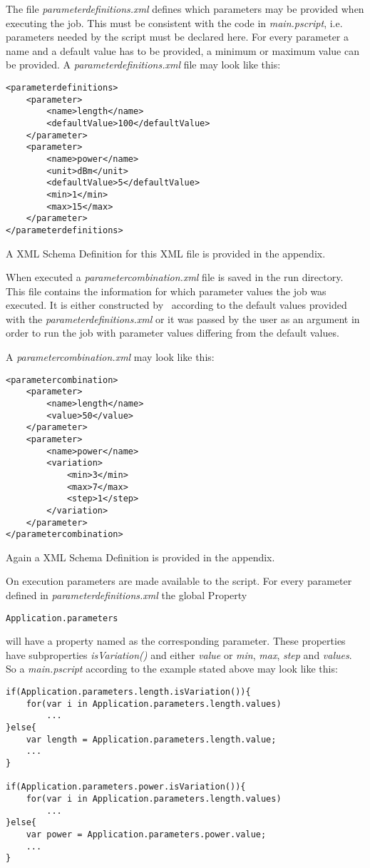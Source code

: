 The file \textit{parameterdefinitions.xml} defines which parameters may be provided when executing the job.
This must be consistent with the code in \textit{main.pscript},
i.e. parameters needed by the script must be declared here.
For every parameter a name and a default value has to be provided,
a minimum or maximum value can be provided.
A \textit{parameterdefinitions.xml} file may look like this:
\lstset{language=XML}
\begin{lstlisting}
<parameterdefinitions>
	<parameter>
		<name>length</name>
		<defaultValue>100</defaultValue>
	</parameter>
	<parameter>
		<name>power</name>
		<unit>dBm</unit>
		<defaultValue>5</defaultValue>
		<min>1</min>
		<max>15</max>
	</parameter>
</parameterdefinitions>
\end{lstlisting}
A XML Schema Definition for this XML file is provided in the appendix.\bb

When executed a \textit{parametercombination.xml} file is saved in the run directory.
This file contains the information for which parameter values the job was executed.
It is either constructed by \photoss\ according to the default values
provided with the \textit{parameterdefinitions.xml}
or it was passed by the user as an argument in order to run the job with parameter values
differing from the default values.

A \textit{parametercombination.xml} may look like this:
\begin{lstlisting}
<parametercombination>
	<parameter>
		<name>length</name>
		<value>50</value>
	</parameter>
	<parameter>
		<name>power</name>
		<variation>
			<min>3</min>
			<max>7</max>
			<step>1</step>
		</variation>
	</parameter>
</parametercombination>
\end{lstlisting}
Again a XML Schema Definition is provided in the appendix.\bb

On execution parameters are made available to the script.
For every parameter defined in \textit{parameterdefinitions.xml}
the global Property
\lstset{language=JavaScript}
\begin{lstlisting}
Application.parameters
\end{lstlisting}
will have a property named as the corresponding parameter.
These properties have subproperties \textit{isVariation()}
and either \textit{value} or \textit{min}, \textit{max}, \textit{step} and \textit{values}.
So a \textit{main.pscript} according to the example stated above may look like this:
\begin{lstlisting}
if(Application.parameters.length.isVariation()){
	for(var i in Application.parameters.length.values)
		...
}else{
	var length = Application.parameters.length.value;
	...
}

if(Application.parameters.power.isVariation()){
	for(var i in Application.parameters.length.values)
		...
}else{
	var power = Application.parameters.power.value;
	...
}
\end{lstlisting}




